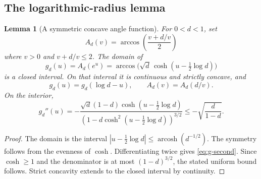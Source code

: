 \documentclass[11pt,a4paper]{article}
\newtheorem{lemma}[theorem]{Lemma}
\theoremstyle{definition}\newtheorem{definition}[theorem]{Definition}
\theoremstyle{remark}\newtheorem{remark}[theorem]{Remark}
\begin{document}
\subsection{The logarithmic-radius lemma}
\begin{lemma}[A symmetric concave angle function]\label{lem:concavity}
For $0<d<1$, set
\[
A_d(v)=\arccos\left(\frac{v+d/v}{2}\right)
\]
where $v>0$ and $v+d/v\le2$. The domain of
\[
g_d(u)=A_d(e^u)
=\arccos\bigl(\sqrt d\,\cosh(u-\tfrac12\log d)\bigr)
\]
is a closed interval. On that interval it is continuous and strictly concave, and
\begin{equation}\label{eq:symmetry}
g_d(u)=g_d(\log d-u),\qquad A_d(v)=A_d(d/v).
\end{equation}
On the interior,
\begin{equation}\label{eq:g-second}
g_d''(u)=
-\frac{\sqrt d(1-d)\cosh(u-\tfrac12\log d)}
{\left(1-d\cosh^2(u-\tfrac12\log d)\right)^{3/2}}
\le-\sqrt{\frac d{1-d}}.
\end{equation}
\end{lemma}
\begin{proof}
The domain is the interval
$|u-\frac12\log d|\le\operatorname{arcosh}(d^{-1/2})$.
The symmetry follows from the evenness of $\cosh$. Differentiating twice gives \eqref{eq:g-second}. Since $\cosh\ge1$ and the denominator is at most $(1-d)^{3/2}$, the stated uniform bound follows. Strict concavity extends to the closed interval by continuity.
\end{proof}
\end{document}
